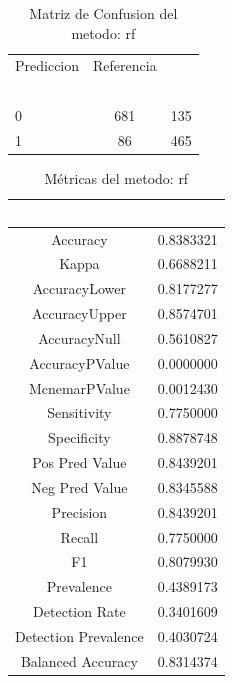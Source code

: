 \begin{table}[!h]
	
	\caption{\label{tab:MatrizConf_rf}Matriz de Confusion del metodo: rf }
	\centering
	\begin{tabular}[t]{lcc}
		\toprule
		\multicolumn{1}{c}{Prediccion} & \multicolumn{1}{c}{Referencia} & \multicolumn{1}{c}{ } \\
		\cmidrule(l{3pt}r{3pt}){1-1} \cmidrule(l{3pt}r{3pt}){2-2}
		\rowcolor{black}  \multicolumn{1}{c}{\textcolor{white}{\textbf{ }}} & \multicolumn{1}{c}{\textcolor{white}{\textbf{0}}} & \multicolumn{1}{c}{\textcolor{white}{\textbf{1}}}\\
		\midrule
		\rowcolor{gray!6}  0 & 681 & 135\\
		1 & 86 & 465\\
		\bottomrule
	\end{tabular}
\end{table}

\begin{table}[!h]
	
	\caption{\label{tab:metricas_rf}Métricas del metodo: rf }
	\centering
	\begin{tabular}[t]{cc}
		\toprule
		\rowcolor{black}  \multicolumn{1}{c}{\textcolor{white}{\textbf{metricas}}} & \multicolumn{1}{c}{\textcolor{white}{\textbf{valor}}}\\
		\midrule
		\rowcolor{gray!6}  Accuracy & 0.8383321\\
		Kappa & 0.6688211\\
		\rowcolor{gray!6}  AccuracyLower & 0.8177277\\
		AccuracyUpper & 0.8574701\\
		\rowcolor{gray!6}  AccuracyNull & 0.5610827\\
		\addlinespace
		AccuracyPValue & 0.0000000\\
		\rowcolor{gray!6}  McnemarPValue & 0.0012430\\
		Sensitivity & 0.7750000\\
		\rowcolor{gray!6}  Specificity & 0.8878748\\
		Pos Pred Value & 0.8439201\\
		\addlinespace
		\rowcolor{gray!6}  Neg Pred Value & 0.8345588\\
		Precision & 0.8439201\\
		\rowcolor{gray!6}  Recall & 0.7750000\\
		F1 & 0.8079930\\
		\rowcolor{gray!6}  Prevalence & 0.4389173\\
		\addlinespace
		Detection Rate & 0.3401609\\
		\rowcolor{gray!6}  Detection Prevalence & 0.4030724\\
		Balanced Accuracy & 0.8314374\\
		\bottomrule
	\end{tabular}
\end{table}


